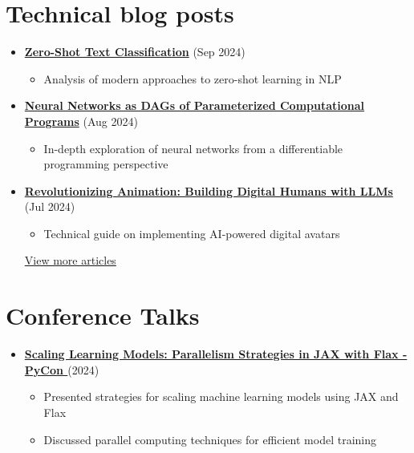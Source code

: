 \documentclass[letterpaper,11pt]{article}
\newcommand{\normalfaExternalLink}{{\mdseries\faExternalLink}}
\newcommand{\normalfaYoutube}{{\mdseries\faYoutube}}
\begin{document}
\section{Technical blog posts}
\begin{itemize}[leftmargin=*]

    \item \textbf{\href{https://www.asanchezyali.com/blog/ai/20240917ZeroShot}{Zero-Shot Text Classification}} (Sep 2024)
    \begin{itemize}
        \item Analysis of modern approaches to zero-shot learning in NLP
    \end{itemize} 
    
    \item \textbf{\href{https://www.asanchezyali.com/blog/differentiable-programming/20240923DifferentiablePrograms}{Neural Networks as DAGs of Parameterized Computational Programs}} (Aug 2024)
    \begin{itemize}
        \item In-depth exploration of neural networks from a differentiable programming perspective
    \end{itemize}
    

    
    \item \textbf{\href{https://monadical.com/posts/build-a-digital-human-with-large-language-models.html}{Revolutionizing Animation: Building Digital Humans with LLMs}} (Jul 2024)
    \begin{itemize}
        \item Technical guide on implementing AI-powered digital avatars
    \end{itemize}
    
    \href{https://www.asanchezyali.com/}{View more articles \normalfaExternalLink}
\end{itemize}

\section{Conference Talks}
\begin{itemize}[leftmargin=*]
    \item \textbf{\href{https://www.youtube.com/watch?v=m4hP1soE414}{Scaling Learning Models: Parallelism Strategies in JAX with Flax - PyCon \normalfaYoutube}} (2024)
    \begin{itemize}
        \item Presented strategies for scaling machine learning models using JAX and Flax
        \item Discussed parallel computing techniques for efficient model training
    \end{itemize}
\end{itemize}
\end{document}
